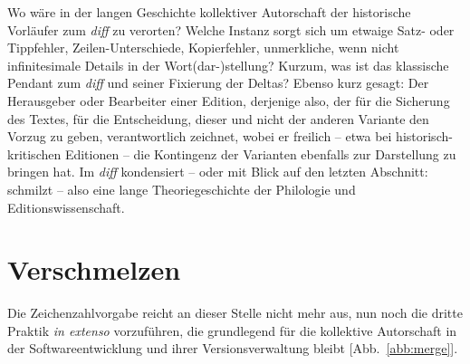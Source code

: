\documentclass[a4paper,11pt]{article}
\newcommand{\anzeige}{\textbf{\color{hokkaido}\huge{\raisebox{-0.18ex}{$\bullet$}}\color{black}}}
\begin{document}
Wo wäre in der langen Geschichte kollektiver Autorschaft der historische Vorläufer zum \emph{diff} zu verorten? Welche Instanz sorgt sich um etwaige Satz- oder Tippfehler, Zeilen-Unterschiede, Kopierfehler, unmerkliche, wenn nicht infinitesimale Details in der Wort(dar-)stellung? Kurzum, was ist das klassische Pendant zum \emph{diff} und seiner Fixierung der Deltas? Ebenso kurz gesagt: Der Herausgeber oder Bearbeiter einer Edition, derjenige also, der für die Sicherung des Textes, für die Entscheidung, dieser und nicht der anderen Variante den Vorzug zu geben, verantwortlich zeichnet, wobei er freilich – etwa bei historisch-kritischen Editionen – die Kontingenz der Varianten ebenfalls zur Darstellung zu bringen hat. Im \emph{diff} kondensiert – oder mit Blick auf den letzten Abschnitt: schmilzt – also eine lange Theoriegeschichte der Philologie und Editionswissenschaft.  

\begin{comment}

Man könnte einen Text, der in Ko-Autorschaft entsteht, natürlich auch in seinen Varianten drucken: 

Bewusste Abweichungen inhaltlicher Art vs. Fehlern: diff findet beides. 
Varianten ausstellen.

Oder einfach nur die Abweichung von der Deckungsgleichheit. Beim Übereinanderlegen oder zeichenweisen Vergleich der Inhalte werden die Unterschiede markiert. 


Die Eingabe von Texten im Redundanz-Modus.

Einsatz mit Skriptorien...

Versionieren, mit Indizes versehen.

Mimetisches:
Wenn einer Als-Ob Auftritt, dann werden vor allem die Differenzen beobachtet...

Scriptorium, Bouvard \& Pecuchet (am Ende)
Name der Rose

\end{comment}



\section{Verschmelzen}

Die Zeichenzahlvorgabe reicht an dieser Stelle nicht mehr aus, nun noch die dritte Praktik \emph{in extenso} vorzuführen, die grundlegend für die kollektive Autorschaft in der Softwareentwicklung und ihrer Versionsverwaltung bleibt [Abb.~\ref{abb:merge}\anzeige]. 
\end{document}

